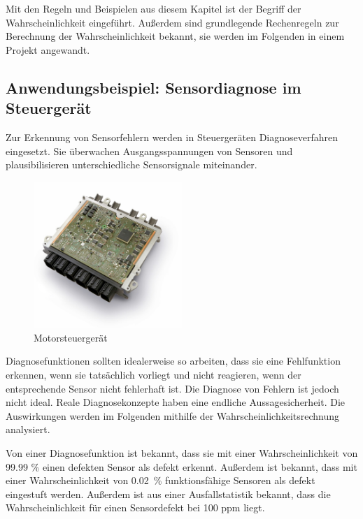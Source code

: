 \noindent Mit den Regeln und Beispielen aus diesem Kapitel ist der Begriff der Wahrscheinlichkeit eingef\"{u}hrt. Au{\ss}erdem sind grundlegende Rechenregeln zur Berechnung der Wahrscheinlichkeit bekannt, sie werden im Folgenden in einem Projekt angewandt.

\clearpage

\subsection{Anwendungsbeispiel: Sensordiagnose im Steuerger\"{a}t}

\noindent Zur Erkennung von Sensorfehlern werden in Steuerger\"{a}ten Diagnoseverfahren eingesetzt. Sie \"{u}berwachen Ausgangsspannungen von Sensoren und plausibilisieren unterschiedliche Sensorsignale miteinander.

\noindent 
\begin{figure}[H]
  \centerline{\includegraphics[width=0.5\textwidth]{Kapitel2/Bilder/image13}}
  \caption{Motorsteuerger\"{a}t}
  \label{fig:Motorsteuergeraet}
\end{figure}

\noindent Diagnosefunktionen sollten idealerweise so arbeiten, dass sie eine Fehlfunktion erkennen, wenn sie tats\"{a}chlich vorliegt und nicht reagieren, wenn der entsprechende Sensor nicht fehlerhaft ist. Die Diagnose von Fehlern ist jedoch nicht ideal. Reale Diagnosekonzepte haben eine endliche Aussagesicherheit. Die Auswirkungen werden im Folgenden mithilfe der Wahrscheinlichkeitsrechnung analysiert.\newline

\noindent Von einer Diagnosefunktion ist bekannt, dass sie mit einer Wahrscheinlichkeit von 99.99 \% einen defekten Sensor als defekt erkennt. Au{\ss}erdem ist bekannt, dass mit einer Wahrscheinlichkeit von 0.02~\% funktionsf\"{a}hige Sensoren als defekt eingestuft werden. Au{\ss}erdem ist aus einer Ausfallstatistik bekannt, dass die Wahrscheinlichkeit f\"{u}r einen Sensordefekt bei 100 ppm liegt. \newline

